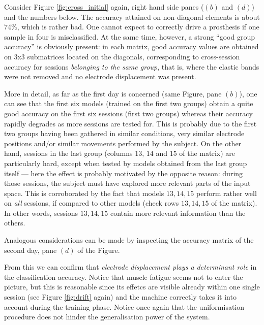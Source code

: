 Consider Figure \ref{fig:cross_initial} again, right hand side panes
($(b)$ and $(d)$) and the numbers below. The accuracy attained on
non-diagonal elements is about $74\%$, which is rather bad. One cannot
expect to correctly drive a prosthesis if one sample in four is
misclassified. At the same time, however, a strong ``good group
accuracy'' is obviously present: in each matrix, good accuracy values
are obtained on 3x3 submatrices located on the diagonals,
corresponding to cross-session accuracy for sessions \emph{belonging
to the same group}, that is, where the elastic bands were not removed
and no electrode displacement was present.

More in detail, as far as the first day is concerned (same Figure,
pane $(b)$), one can see that the first six models (trained on the
first two groups) obtain a quite good accuracy on the first six
sessions (first two groups) whereas their accuracy rapidly degrades as
more sessions are tested for. This is probably due to the first two
groups having been gathered in similar conditions, very similar
electrode positions and/or similar movements performed by the
subject. On the other hand, sessions in the last group (columns $13$,
$14$ and $15$ of the matrix) are particularly hard, except when tested
by models obtained from the last group itself --- here the effect is
probably motivated by the opposite reason: during those sessions, the
subject must have explored more relevant parts of the input
space. This is corroborated by the fact that models $13,14,15$ perform
rather well on \emph{all} sessions, if compared to other models (check
rows $13,14,15$ of the matrix). In other words, sessions $13,14,15$
contain more relevant information than the others.

Analogous considerations can be made by inspecting the accuracy matrix
of the second day, pane $(d)$ of the Figure.

From this we can confirm that \emph{electrode displacement plays a
determinant role} in the classification accuracy. Notice that muscle
fatigue seems not to enter the picture, but this is reasonable since
its effetcs are visible already within one single session (see Figure
\ref{fig:drift} again) and the machine correctly takes it into account
during the training phase. Notice once again that the uniformisation
procedure does not hinder the generalisation power of the system.

